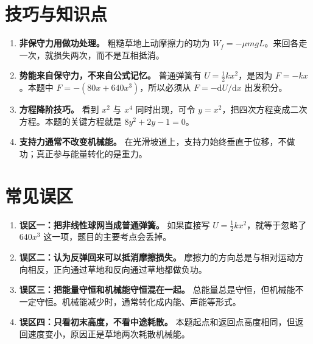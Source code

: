 \documentclass[11pt,a4paper,fontset=fandol]{ctexart}
\newcommand{\dd}{\mathrm{d}}
\begin{document}
\section*{技巧与知识点}
\begin{tipBox}
\begin{enumerate}
 \item \textbf{非保守力用做功处理。} 粗糙草地上动摩擦力的功为 $W_f=-\mu mgL$。来回各走一次，就损失两次，而不是互相抵消。
 \item \textbf{势能来自保守力，不来自公式记忆。} 普通弹簧有 $U=\frac12kx^2$，是因为 $F=-kx$。本题中 $F=-(80x+640x^3)$，所以必须从 $F=-\dd U/\dd x$ 出发积分。
 \item \textbf{方程降阶技巧。} 看到 $x^2$ 与 $x^4$ 同时出现，可令 $y=x^2$，把四次方程变成二次方程。本题的关键方程就是 $8y^2+2y-1=0$。
 \item \textbf{支持力通常不改变机械能。} 在光滑坡道上，支持力始终垂直于位移，不做功；真正参与能量转化的是重力。
\end{enumerate}
\end{tipBox}

\section*{常见误区}
\begin{warnBox}
\begin{enumerate}
 \item \textbf{误区一：把非线性球网当成普通弹簧。} 如果直接写 $U=\frac12kx^2$，就等于忽略了 $640x^3$ 这一项，题目的主要考点会丢掉。
 \item \textbf{误区二：认为反弹回来可以抵消摩擦损失。} 摩擦力的方向总是与相对运动方向相反，正向通过草地和反向通过草地都做负功。
 \item \textbf{误区三：把能量守恒和机械能守恒混在一起。} 总能量总是守恒，但机械能不一定守恒。机械能减少时，通常转化成内能、声能等形式。
 \item \textbf{误区四：只看初末高度，不看中途耗散。} 本题起点和返回点高度相同，但返回速度变小，原因正是草地两次耗散机械能。
\end{enumerate}
\end{warnBox}
\end{document}
